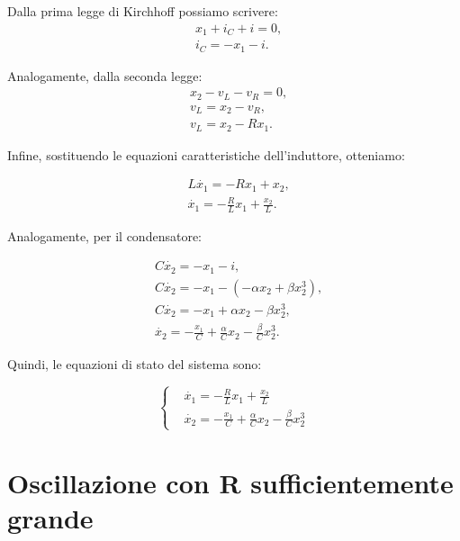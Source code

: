 \documentclass{article}
\begin{document}
Dalla prima legge di Kirchhoff possiamo scrivere:
\begin{align*}
     & x_1 + i_C + i = 0,        \\
     & i_C           = -x_1 - i.
\end{align*}

Analogamente, dalla seconda legge:
\begin{align*}
     & x_2 - v_L - v_R = 0,           \\
     & v_L             = x_2 - v_R,   \\
     & v_L             = x_2 - R x_1.
\end{align*}

Infine, sostituendo le equazioni caratteristiche dell'induttore, otteniamo:

\begin{align*}
     & L \dot{x_1} = - R x_1 + x_2,                    \\
     & \dot{x_1}   = -\frac{R}{L} x_1 + \frac{x_2}{L}.
\end{align*}

Analogamente, per il condensatore:

\begin{align*}
     & C \dot{x_2} = -x_1 - i,                                                      \\
     & C \dot{x_2} = -x_1 - (-\alpha x_2 + \beta x_2^3),                            \\
     & C \dot{x_2} = -x_1 + \alpha x_2 - \beta x_2^3,                               \\
     & \dot{x_2}   = -\frac{x_1}{C} + \frac{\alpha}{C} x_2 - \frac{\beta}{C} x_2^3.
\end{align*}

Quindi, le equazioni di stato del sistema sono:

\begin{equation}
    \left\{
    \begin{aligned}
         & \dot{x_1} = -\frac{R}{L}x_1 + \frac{x_2}{L}                             \\
         & \dot{x_2} = -\frac{x_1}{C} + \frac{\alpha}{C}x_2 - \frac{\beta}{C}x_2^3
    \end{aligned}
    \right.
\end{equation}

\section{Oscillazione con R sufficientemente grande}
\end{document}
